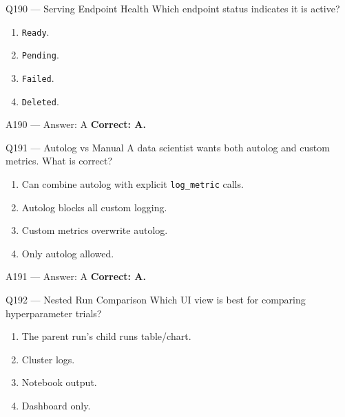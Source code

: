 \documentclass[aspectratio=169,9pt]{beamer}
\begin{document}
	\begin{frame}{Q190 --- Serving Endpoint Health}
		Which endpoint status indicates it is active?
		\begin{enumerate}[label=\Alph*.]
			\item \texttt{Ready}.
			\item \texttt{Pending}.
			\item \texttt{Failed}.
			\item \texttt{Deleted}.
		\end{enumerate}
	\end{frame}
	
	\begin{frame}{A190 --- Answer: A}
		\textbf{Correct: A.}
	\end{frame}
	
	
	\begin{frame}{Q191 --- Autolog vs Manual}
		A data scientist wants both autolog and custom metrics. What is correct?
		\begin{enumerate}[label=\Alph*.]
			\item Can combine autolog with explicit \texttt{log\_metric} calls.
			\item Autolog blocks all custom logging.
			\item Custom metrics overwrite autolog.
			\item Only autolog allowed.
		\end{enumerate}
	\end{frame}
	
	\begin{frame}{A191 --- Answer: A}
		\textbf{Correct: A.}
	\end{frame}
	
	\begin{frame}{Q192 --- Nested Run Comparison}
		Which UI view is best for comparing hyperparameter trials?
		\begin{enumerate}[label=\Alph*.]
			\item The parent run's child runs table/chart.
			\item Cluster logs.
			\item Notebook output.
			\item Dashboard only.
		\end{enumerate}
	\end{frame}
	
\end{document}
